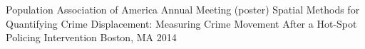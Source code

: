 \begin{cventries}
  \cventry
    {Population Association of America Annual Meeting (poster)} %
    {Spatial Methods for Quantifying Crime Displacement: Measuring Crime Movement After a Hot-Spot Policing Intervention} %
    {Boston, MA} %
    {2014} %
    {}




\end{cventries}
